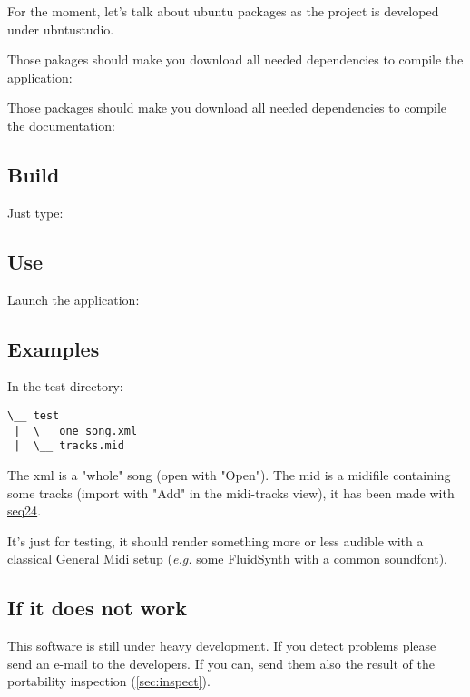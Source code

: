 For the moment, let's talk about ubuntu packages as the project is developed
under ubntustudio. 

Those pakages should make you download all needed dependencies to compile the
application:


Those packages should make you download all needed dependencies to compile the
documentation:


\subsection{Build}

Just type:


\subsection{Use}

Launch the application:


\subsection{Examples}
In the test directory:

\begin{verbatim}
\__ test
 |  \__ one_song.xml
 |  \__ tracks.mid
\end{verbatim}

The xml is a "whole" song (open with "Open").  The mid is a midifile containing
some tracks (import with "Add" in the midi-tracks view), it has been made with
\href{http://www.filter24.org/seq24/}{seq24}.

It's just for testing, it should render something more or less audible with a
classical General Midi setup (\textit{e.g.} some FluidSynth with a common
soundfont).

\subsection{If it does not work}

This software is still under heavy development. If you detect problems please
send an e-mail to the developers. If you can, send them also the result of the
portability inspection (\ref{sec:inspect}).


